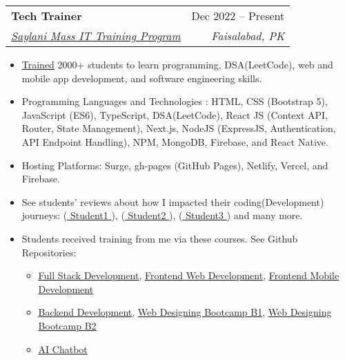 \documentclass[letterpaper,11pt]{article}
\makeatletter
\newcommand{\resumeItem}[1]{
  \item\small{
    {#1 \vspace{-2pt}}
  }
}
\newcommand{\resumeSubheading}[4]{
  \vspace{-2pt}\item
    \begin{tabular*}{0.97\textwidth}[t]{l@{\extracolsep{\fill}}r}
      \textbf{#1} & #2 \\
      \textit{\small#3} & \textit{\small #4} \\
    \end{tabular*}\vspace{-7pt}
}
\newcommand{\resumeItemListStart}{\begin{itemize}}
\newcommand{\resumeItemListEnd}{\end{itemize}\vspace{-5pt}}
\makeatother
\begin{document}
\resumeSubheading
{Tech Trainer}{Dec 2022 -- Present}
{{\href{https://saylaniwelfareusa.com/en/services/education/technical-education/saylani-mass-it-training}{\underline{Saylani Mass IT Training Program}}}}{Faisalabad, PK}
\resumeItemListStart
\resumeItem{{\href{https://www.linkedin.com/posts/ahmad-jajja_learn-to-code-with-activity-7151895134744256512-Dmyf?utm_source=share&utm_medium=member_desktop}{\underline{Trained}}} 2000+ students to learn programming, DSA(LeetCode), web and mobile app development, and software engineering skills.}
\resumeItem{Programming Languages and Technologies : HTML, CSS (Bootstrap 5), JavaScript (ES6), TypeScript, DSA(LeetCode), React JS (Context API, Router, State Management), Next.js, NodeJS (ExpressJS, Authentication, API Endpoint Handling), NPM, MongoDB, Firebase, and React Native.}
\resumeItem{Hosting Platforms: Surge, gh-pages (GitHub Pages), Netlify, Vercel, and Firebase.}
\resumeItem{See students' reviews about how I impacted their coding(Development) journeys: ({\href{https://www.linkedin.com/posts/hassan-gulzar-256292267_javascript-problemsolvingskills-activity-7092472595249270784-PFDk?utm_source=share&utm_medium=member_desktop}{\underline{ Student1 }}}), ({\href{https://www.linkedin.com/posts/arhamansari12_nodejs-expressjs-mongodb-activity-7137844125382418432-SBrL?utm_source=share&utm_medium=member_desktop}{\underline{ Student2 }}}), ({\href{https://www.linkedin.com/feed/update/urn:li:activity:7171897869098962944/}{\underline{ Student3 }}}) and many more. }
\resumeItem{Students received training from me via these courses. See Github Repositories:}
\begin{itemize}
  \item {\href{https://github.com/Ahmadjajja/SMIT-Web-and-Mobile-Batch7}{\underline{Full Stack Development}}, \hspace{8pt} \href{https://github.com/Ahmadjajja/SMIT-WMA-6-A-E}{\underline{Frontend Web Development}}, \hspace{8pt} \href{https://github.com/Ahmadjajja/Mobile_Application_Development}{\underline{Frontend Mobile Development }}}
  \item {\href{https://github.com/Ahmadjajja/Backend_Development.git}{\underline{Backend Development}}, \hspace{12pt} \href{https://github.com/Ahmadjajja/Web_Designing_Crash_Course_A}{\underline{Web Designing Bootcamp B1}}, \hspace{6pt} \href{https://github.com/Ahmadjajja/Web_Designing_Crash_Course_B}{\underline{Web Designing Bootcamp B2}}}
  \item {\href{https://github.com/Ahmadjajja/AI-Chatbot}{\underline{AI Chatbot}}}
\end{itemize}
\resumeItemListEnd
\end{document}
